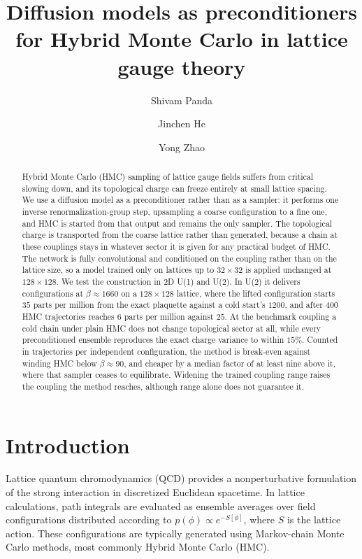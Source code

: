 \documentclass[prd, twocolumn, superscriptaddress, nofootinbib,floatfix]{revtex4-2}
\begin{document}
\title{Diffusion models as preconditioners for Hybrid Monte Carlo in
lattice gauge theory}

\author{Shivam Panda}
\author{Jinchen He}
\author{Yong Zhao}

\begin{abstract}
Hybrid Monte Carlo (HMC) sampling of lattice gauge fields suffers from critical
slowing down, and its topological charge can freeze entirely at small lattice
spacing. We use a diffusion model as a preconditioner rather than as a sampler:
it performs one inverse renormalization-group step, upsampling a coarse
configuration to a fine one, and HMC is started from that output and remains the
only sampler. The topological charge is transported from the coarse lattice rather than
generated, because a chain at these couplings stays in whatever sector it is
given for any practical budget of HMC. The network is fully convolutional and conditioned on the
coupling rather than on the lattice size, so a model trained only on lattices up
to $32\times32$ is applied unchanged at $128\times128$. We test the construction in 2D U(1) and U(2). In U(2) it
delivers configurations at $\beta\approx1660$ on a $128\times128$ lattice, where the lifted configuration starts $35$ parts per million from the exact
plaquette against a cold start's $1200$, and after $400$ HMC trajectories
reaches $6$ parts per million against $25$.
At the benchmark coupling a cold chain under plain HMC does not change
topological sector at all, while every preconditioned ensemble reproduces the
exact charge variance to within $15\%$. Counted in trajectories per independent
configuration, the method is break-even against winding HMC below $\beta\approx90$, and cheaper by a median factor of
at least nine above it, where that sampler ceases to equilibrate. Widening the
trained coupling range raises the coupling the method reaches, although range
alone does not guarantee it.
\end{abstract}


\maketitle

\section{Introduction}
\label{sec:intro}
Lattice quantum chromodynamics (QCD) provides a nonperturbative formulation of the strong interaction in discretized Euclidean spacetime. In lattice calculations, path integrals are evaluated as ensemble averages over field configurations distributed according to $p(\phi)\propto e^{-S[\phi]}$, where $S$ is the lattice action. These configurations are typically generated using Markov-chain Monte Carlo methods, most commonly Hybrid Monte Carlo (HMC).
\end{document}

